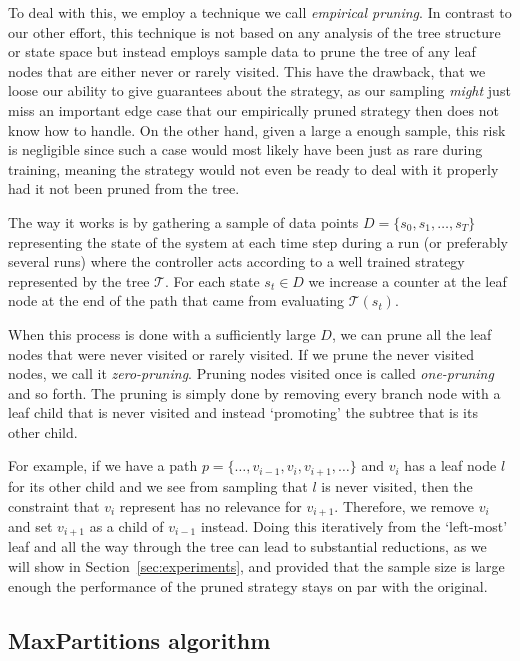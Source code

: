 To deal with this, we employ a technique we call \textit{empirical pruning}. In
contrast to our other effort, this technique is not based on any analysis of the
tree structure or state space but instead employs sample data to prune the tree
of any leaf nodes that are either never or rarely visited. This have the
drawback, that we loose our ability to give guarantees about the strategy, as our
sampling \textit{might} just miss an important edge case that our empirically
pruned strategy then does not know how to handle. On the other hand, given a
large a enough sample, this risk is negligible since such a case would most
likely have been just as rare during training, meaning the strategy would not
even be ready to deal with it properly had it not been pruned from the tree.

The way it works is by gathering a sample of data points $D = \{ s_0, s_1,
\ldots, s_T\}$ representing the state of the system at each time step during a
run (or preferably several runs) where the controller acts according to a well
trained strategy represented by the tree $\mathcal{T}$. For each state $s_t \in
D$ we increase a counter at the leaf node at the end of the path that came from
evaluating $\mathcal{T}(s_t)$.

When this process is done with a sufficiently large $D$, we can prune all the
leaf nodes that were never visited or rarely visited. If we prune the never
visited nodes, we call it \textit{zero-pruning}. Pruning nodes visited once is
called \textit{one-pruning} and so forth. The pruning is simply done by removing
every branch node with a leaf child that is never visited and instead
`promoting' the subtree that is its other child.

For example, if we have a path $p = \{ \ldots, v_{i-1}, v_i, v_{i+1}, \ldots \}$
and $v_i$ has a leaf node $l$ for its other child and we see from sampling that
$l$ is never visited, then the constraint that $v_i$ represent has no relevance
for $v_{i+1}$. Therefore, we remove $v_i$ and set $v_{i+1}$ as a child of
$v_{i-1}$ instead. Doing this iteratively from the `left-most' leaf and all the
way through the tree can lead to substantial reductions, as we will show in
Section~\ref{sec:experiments}, and provided that the sample size is large enough
the performance of the pruned strategy stays on par with the original.

\subsection{MaxPartitions algorithm}%
\label{sub:maxParts}

